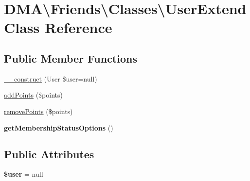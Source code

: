 \hypertarget{classDMA_1_1Friends_1_1Classes_1_1UserExtend}{\section{D\+M\+A\textbackslash{}Friends\textbackslash{}Classes\textbackslash{}User\+Extend Class Reference}
\label{classDMA_1_1Friends_1_1Classes_1_1UserExtend}
}
\subsection*{Public Member Functions}
\begin{DoxyCompactItemize}
\item 
\hyperlink{classDMA_1_1Friends_1_1Classes_1_1UserExtend_aa399d503ccb972cb46171bd7cc2fbadf}{\+\_\+\+\_\+construct} (User \$user=null)
\item 
\hyperlink{classDMA_1_1Friends_1_1Classes_1_1UserExtend_ae2d0cddf99425d8ffbe2ed2c74372024}{add\+Points} (\$points)
\item 
\hyperlink{classDMA_1_1Friends_1_1Classes_1_1UserExtend_a452030297bbe4f11bb8452e4d57396cd}{remove\+Points} (\$points)
\item 
\hypertarget{classDMA_1_1Friends_1_1Classes_1_1UserExtend_ac1de8e9326eaa1466503bf34fa0a3748}{{\bfseries get\+Membership\+Status\+Options} ()}\label{classDMA_1_1Friends_1_1Classes_1_1UserExtend_ac1de8e9326eaa1466503bf34fa0a3748}

\end{DoxyCompactItemize}
\subsection*{Public Attributes}
\begin{DoxyCompactItemize}
\item 
\hypertarget{classDMA_1_1Friends_1_1Classes_1_1UserExtend_ab5502f589b8c00f7a847a3ebece55281}{{\bfseries \$user} = null}\label{classDMA_1_1Friends_1_1Classes_1_1UserExtend_ab5502f589b8c00f7a847a3ebece55281}

\end{DoxyCompactItemize}


